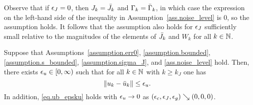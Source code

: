 Observe that if $\epsilon_J = 0$, then $J_k = {\bar J}_k$ and $\Gamma_k = {\bar \Gamma}_k$, in which case the expression on the left-hand side of the inequality in Assumption~\ref{ass.noise_level} is 0, so the assumption holds.  It follows that the assumption also holds for $\epsilon_J$ sufficiently small relative to the magnitudes of the elements of ${\bar J}_k$ and $W_k$ for all $k \in \mathbb{N}$.

\begin{lemma}\label{lemma.ub_epsku}
  Suppose that Assumptions~\ref{assumption.err0}, \ref{assumption.bounded}, \ref{assumption.s_bounded}, \ref{assumption.sigma_J}, and \ref{ass.noise_level} hold.  Then, there exists $\epsilon_u \in [0,\infty)$ such that for all $k \in \mathbb{N}$ with $k \geq k_J$ one has
  \begin{equation}\label{eq.ub_epsku}
    \|u_k - {\bar u}_k \| \leq \epsilon_u.
  \end{equation}
  In addition, \eqref{eq.ub_epsku} holds with $\epsilon_u \to 0$ as $(\epsilon_c,\epsilon_J,\epsilon_g) \searrow (0,0,0)$.
\end{lemma}

